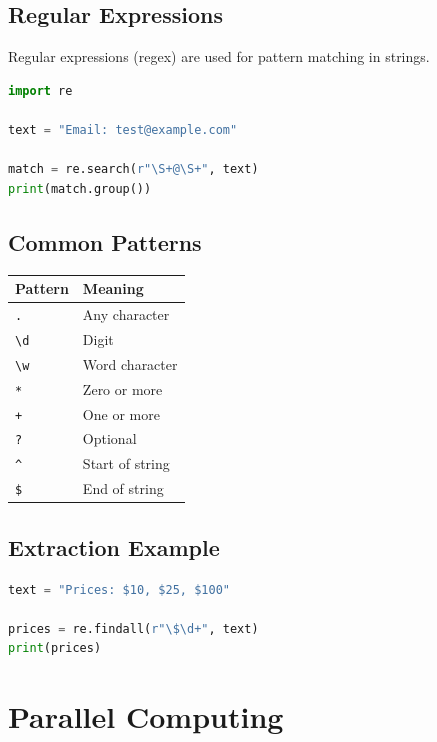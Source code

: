 \documentclass[12pt,oneside]{book}
\numberwithin{equation}{section}
\theoremstyle{definition}
\theoremstyle{plain}
\theoremstyle{remark}
\begin{document}
\subsection{Regular Expressions}

Regular expressions (regex) are used for pattern matching in strings.

\begin{lstlisting}[language=Python]
import re

text = "Email: test@example.com"

match = re.search(r"\S+@\S+", text)
print(match.group())
\end{lstlisting}

\subsection{Common Patterns}

\begin{center}
\begin{xltabular}{\textwidth}{>{\raggedright\arraybackslash}p{0.25\textwidth}
>{\raggedright\arraybackslash}X}
\toprule
Pattern & Meaning \\
\midrule
\texttt{.} & Any character \\
\texttt{\textbackslash d} & Digit \\
\texttt{\textbackslash w} & Word character \\
\texttt{*} & Zero or more \\
\texttt{+} & One or more \\
\texttt{?} & Optional \\
\texttt{\^} & Start of string \\
\texttt{\$} & End of string \\
\bottomrule
\end{xltabular}
\end{center}

\subsection{Extraction Example}

\begin{lstlisting}[language=Python]
text = "Prices: $10, $25, $100"

prices = re.findall(r"\$\d+", text)
print(prices)
\end{lstlisting}

\section{Parallel Computing}
\end{document}
